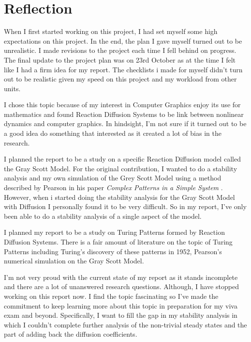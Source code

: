 \documentclass[a4paper, 11pt]{article}
\begin{document}
\pagebreak
\section{Reflection}
When I first started working on this project, I had set myself some high expectations on this project. In the end, the plan I gave myself turned out to be unrealistic. I made revisions to the project each time I fell behind on progress. The final update to the project plan was on 23rd October as at the time I felt like I had a firm idea for my report. The checklists i made for myself didn't turn out to be realistic given my speed on this project and my workload from other units. 

I chose this topic because of my interest in Computer Graphics enjoy its use for mathematics and found Reaction Diffusion Systems to be link between nonlinear dynamics and computer graphics. In hindsight, I'm not sure if it turned out to be a good idea do something that interested as it created a lot of bias in the research.   

I planned the report to be a study on a specific Reaction Diffusion model called the Gray Scott Model. For the original contribution, I wanted to do a stability analysis and my own simulation of the Grey Scott Model using a method described by Pearson in his paper \textit{Complex Patterns in a Simple System} \parencite{pearson1993}. However, when i started doing the stability analysis for the Gray Scott Model with Diffusion I personally found it to be very difficult. So in my report, I’ve only been able to do a stability analysis of a single aspect of the model. 

I planned my report to be a study on Turing Patterns formed by Reaction Diffusion Systems. There is a fair amount of literature on the topic of Turing Patterns including Turing's discovery of these patterns in 1952, Pearson's numerical simulation \parencite{pearson1993} on the Gray Scott Model.   

I’m not very proud with the current state of my report as it stands incomplete and there are a lot of unanswered research questions. Although, I have stopped working on this report now. I find the topic fascinating so I've made the commitment to keep learning more about this topic in preparation for my viva exam and beyond. Specifically, I want to fill the gap in my stability analysis in which I couldn't complete further analysis of the non-trivial steady states and the part of adding back the diffusion coefficients. 
\end{document}
